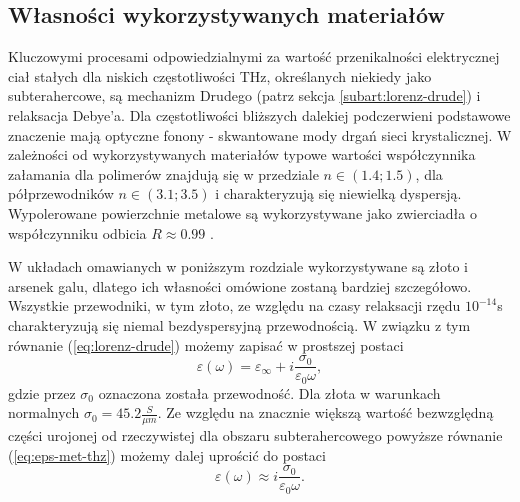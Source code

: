 \subsection{Własności wykorzystywanych materiałów}
Kluczowymi procesami odpowiedzialnymi za wartość przenikalności elektrycznej ciał stałych dla niskich częstotliwości THz, określanych niekiedy jako subterahercowe, są mechanizm Drudego (patrz sekcja \ref{subart:lorenz-drude}) i relaksacja Debye'a. Dla częstotliwości bliższych dalekiej podczerwieni podstawowe znaczenie mają optyczne fonony - skwantowane mody drgań sieci krystalicznej. W zależności od wykorzystywanych materiałów typowe wartości współczynnika załamania dla polimerów znajdują się w przedziale $n \in (1.4;1.5)$, dla półprzewodników $n\in (3.1;3.5)$ i charakteryzują się niewielką dyspersją. Wypolerowane powierzchnie metalowe są wykorzystywane jako zwierciadła o współczynniku odbicia $R\approx 0.99$ \cite{lee2009principles}.

W układach omawianych w poniższym rozdziale wykorzystywane są złoto i arsenek galu, dlatego ich własności omówione zostaną bardziej szczegółowo. Wszystkie przewodniki, w tym złoto, ze względu na czasy relaksacji rzędu $10^{-14}$s charakteryzują się niemal bezdyspersyjną przewodnością. W związku z tym równanie (\ref{eq:lorenz-drude}) możemy zapisać w prostszej postaci
\begin{equation}
	\varepsilon(\omega)=\varepsilon_{\infty}+i \frac{\sigma_0}{\varepsilon_0 \omega},
	\label{eq:eps-met-thz}
\end{equation}
gdzie przez $\sigma_0$ oznaczona została przewodność. Dla złota w warunkach normalnych $\sigma_0=45.2 \frac{S}{\mu m}$.   Ze względu na znacznie większą wartość bezwzględną części urojonej od rzeczywistej dla obszaru subterahercowego powyższe równanie (\ref{eq:eps-met-thz}) możemy dalej uprościć do postaci
\begin{equation}
	\varepsilon(\omega) \approx i \frac{\sigma_0}{\varepsilon_0 \omega}.
	\label{eq:eps-met-thz-app}
\end{equation}

